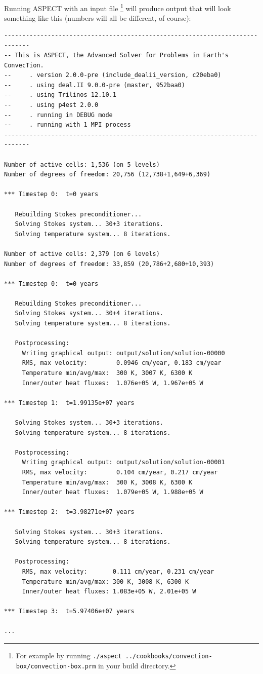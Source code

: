 \documentclass{article}
\newcommand{\aspect}{\textsc{ASPECT}}
\begin{document}
Running \aspect{} with an input file
\footnote{For example by running \texttt{./aspect ../cookbooks/convection-box/convection-box.prm} in
your build directory.}
will produce output that will look
something like this (numbers will all be different, of course):
\begin{lstlisting}[frame=single,language=ksh]
-----------------------------------------------------------------------------
-- This is ASPECT, the Advanced Solver for Problems in Earth's ConvecTion.
--     . version 2.0.0-pre (include_dealii_version, c20eba0)
--     . using deal.II 9.0.0-pre (master, 952baa0)
--     . using Trilinos 12.10.1
--     . using p4est 2.0.0
--     . running in DEBUG mode
--     . running with 1 MPI process
-----------------------------------------------------------------------------

Number of active cells: 1,536 (on 5 levels)
Number of degrees of freedom: 20,756 (12,738+1,649+6,369)

*** Timestep 0:  t=0 years

   Rebuilding Stokes preconditioner...
   Solving Stokes system... 30+3 iterations.
   Solving temperature system... 8 iterations.

Number of active cells: 2,379 (on 6 levels)
Number of degrees of freedom: 33,859 (20,786+2,680+10,393)

*** Timestep 0:  t=0 years

   Rebuilding Stokes preconditioner...
   Solving Stokes system... 30+4 iterations.
   Solving temperature system... 8 iterations.

   Postprocessing:
     Writing graphical output: output/solution/solution-00000
     RMS, max velocity:        0.0946 cm/year, 0.183 cm/year
     Temperature min/avg/max:  300 K, 3007 K, 6300 K
     Inner/outer heat fluxes:  1.076e+05 W, 1.967e+05 W

*** Timestep 1:  t=1.99135e+07 years

   Solving Stokes system... 30+3 iterations.
   Solving temperature system... 8 iterations.

   Postprocessing:
     Writing graphical output: output/solution/solution-00001
     RMS, max velocity:        0.104 cm/year, 0.217 cm/year
     Temperature min/avg/max:  300 K, 3008 K, 6300 K
     Inner/outer heat fluxes:  1.079e+05 W, 1.988e+05 W

*** Timestep 2:  t=3.98271e+07 years

   Solving Stokes system... 30+3 iterations.
   Solving temperature system... 8 iterations.

   Postprocessing:
     RMS, max velocity:       0.111 cm/year, 0.231 cm/year
     Temperature min/avg/max: 300 K, 3008 K, 6300 K
     Inner/outer heat fluxes: 1.083e+05 W, 2.01e+05 W

*** Timestep 3:  t=5.97406e+07 years

...
\end{lstlisting}
\end{document}
